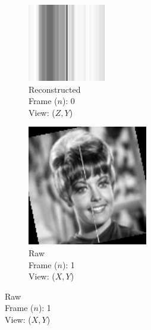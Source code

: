 \documentclass{osa-article}
\begin{document}
\begin{figure}
\begin{subfigure}[t]{0.2\linewidth}
  \end{subfigure}\hfill
  \begin{subfigure}[t]{0.2\linewidth}
    \centering
    \includegraphics[width=\linewidth]{./figures/results/3D_python/no_drift_zelda/0/zx_recon}\caption{Reconstructed\\Frame (\(n\)): 0\\View: (\(Z,Y\))}
  \end{subfigure}
  \begin{subfigure}[t]{0.2\linewidth}
    \centering
    \includegraphics[width=\linewidth]{./figures/results/3D_python/no_drift_zelda/1/xy}\caption{Raw\\Frame (\(n\)): 1\\View: (\(X,Y\))}

\end{subfigure}
\end{figure}
\end{document}
